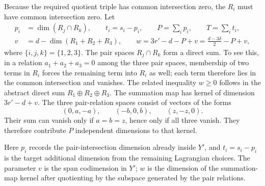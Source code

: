 Because the required quotient triple has common intersection zero,
the $R_i$ must have common intersection zero.  Let
\begin{equation}\label{eq:planted-subspace-parameters}
 \begin{split}
 p_i&=\dim(R_j\cap R_k),\qquad t_i=s_i-p_i,\qquad
 P=\sum_i p_i,\qquad T=\sum_i t_i,\\
 v&=d-\dim(R_1+R_2+R_3),\qquad
 w=3r'-d-P+v=\frac{d-3\delta}{2}-P+v,
 \end{split}
\end{equation}
where $\{i,j,k\}=\{1,2,3\}$.
The pair spaces $R_j\cap R_k$ form a direct sum.  To see this, in a
relation $a_1+a_2+a_3=0$ among the three pair spaces, membership of
two terms in $R_i$ forces the remaining term into $R_i$ as well;
each term therefore lies in the common intersection and vanishes.
The related inequality $w\ge0$ follows in the abstract direct sum
$R_1\oplus R_2\oplus R_3$.  The summation map has kernel of
dimension $3r'-d+v$.  The three pair-relation spaces consist of
vectors of the forms
\[
 (0,a,-a),\qquad (-b,0,b),\qquad (z,-z,0).
\]
Their sum can vanish only if $a=b=z$, hence only if all three vanish.
They therefore contribute $P$ independent dimensions to that kernel.

Here $p_i$ records the pair-intersection dimension already inside $Y'$,
and $t_i=s_i-p_i$ is the target additional dimension from the remaining
Lagrangian choices. The parameter $v$ is the span codimension in $Y'$;
$w$ is the dimension of the summation-map kernel after quotienting by
the subspace generated by the pair relations.

